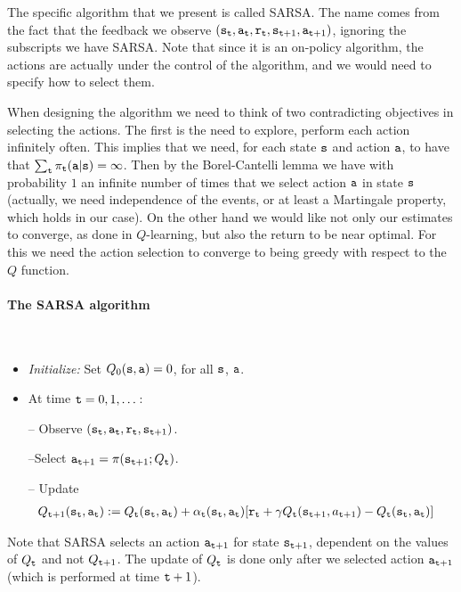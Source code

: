 The specific algorithm that we present is called SARSA. The name
comes from the fact that the feedback we observe
$({\tt s}_{\tt t},{\tt a}_{\tt t},{\tt r}_{\tt t},{\tt s}_{{\tt t}+1},{\tt a}_{{\tt t}+1})$,
ignoring the subscripts we have SARSA. Note that since it is an
on-policy algorithm, the actions are actually under the control of
the algorithm, and we would need to specify how to select them.

When designing the algorithm we need to think of two contradicting
objectives in selecting the actions. The first is the need to
explore, perform each action infinitely often. This implies that we
need, for each state ${\tt s}$ and action ${\tt a}$, to have that $\sum_{\tt t}
\pi_{\tt t}({\tt a}|{\tt s})=\infty$. Then by the Borel-Cantelli
lemma we have with probability $1$ an infinite number of times that
we select action ${\tt a}$ in state ${\tt s}$ (actually, we need
independence of the events, or at least a Martingale property, which
holds in our case). On the other hand we would like not only our
estimates to converge, as done in $Q$-learning, but also the return
to be near optimal. For this we need the action selection to
converge to being greedy with respect to the $Q$ function.

\paragraph{The SARSA algorithm}\ \\


\begin{itemize}
\item {\em Initialize:} Set $ Q_0({\tt s},{\tt a})=0$, for all ${\tt s}$, ${\tt a}$.

\item At time ${\tt t}=0,1,\dots$:

-- Observe
$({\tt s}_{\tt t},{\tt a}_{\tt t},{\tt r}_{\tt t},{\tt s}_{{\tt t}+1})$.

--Select ${\tt a}_{{\tt t}+1}=\pi({\tt s}_{{\tt t}+1};Q_{\tt t})$.

-- Update %
\begin{align*}
 Q_{{\tt t}+1}({\tt s}_{\tt t},{\tt a}_{\tt t}) & :=   Q_{\tt t} ({\tt s}_{\tt t},{\tt a}_{\tt t}) + \alpha_{\tt t}({\tt s}_{\tt t},{\tt a}_{\tt t})  [{\tt r}_{\tt t} +
\gamma  Q_{\tt t} ({\tt s}_{{\tt t}+1}, a_{{\tt t}+1}) -Q_{\tt t}
({\tt s}_{\tt t},{\tt a}_{\tt t})]
\end{align*}
\end{itemize}
Note that SARSA selects an action ${\tt a}_{{\tt t}+1}$ for state
${\tt s}_{{\tt t}+1}$, dependent on the values of $Q_{\tt t}$ and not
$Q_{{\tt t}+1}$. The update of $Q_{\tt t}$ is done only after we
selected action ${\tt a}_{{\tt t}+1}$ (which is performed at time
${\tt t}+1$).

